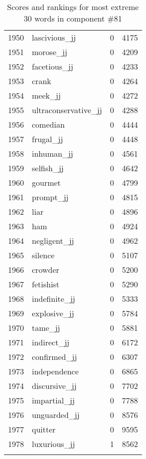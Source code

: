 \begin{longtable}[!htbp]{| rlr@{.}l |}
    1950 & lascivious\_jj & 0 & 4175 \\
    1951 & morose\_jj & 0 & 4209 \\
    1952 & facetious\_jj & 0 & 4233 \\
    1953 & crank & 0 & 4264 \\
    1954 & meek\_jj & 0 & 4272 \\
    1955 & ultraconservative\_jj & 0 & 4288 \\
    1956 & comedian & 0 & 4444 \\
    1957 & frugal\_jj & 0 & 4448 \\
    1958 & inhuman\_jj & 0 & 4561 \\
    1959 & selfish\_jj & 0 & 4642 \\
    1960 & gourmet & 0 & 4799 \\
    1961 & prompt\_jj & 0 & 4815 \\
    1962 & liar & 0 & 4896 \\
    1963 & ham & 0 & 4924 \\
    1964 & negligent\_jj & 0 & 4962 \\
    1965 & silence & 0 & 5107 \\
    1966 & crowder & 0 & 5200 \\
    1967 & fetishist & 0 & 5290 \\
    1968 & indefinite\_jj & 0 & 5333 \\
    1969 & explosive\_jj & 0 & 5784 \\
    1970 & tame\_jj & 0 & 5881 \\
    1971 & indirect\_jj & 0 & 6172 \\
    1972 & confirmed\_jj & 0 & 6307 \\
    1973 & independence & 0 & 6865 \\
    1974 & discursive\_jj & 0 & 7702 \\
    1975 & impartial\_jj & 0 & 7788 \\
    1976 & unguarded\_jj & 0 & 8576 \\
    1977 & quitter & 0 & 9595 \\
    1978 & luxurious\_jj & 1 & 8562 \\
    \hline
    \caption{Scores and rankings for most extreme 30 words in component \#81} \\
\end{longtable}
